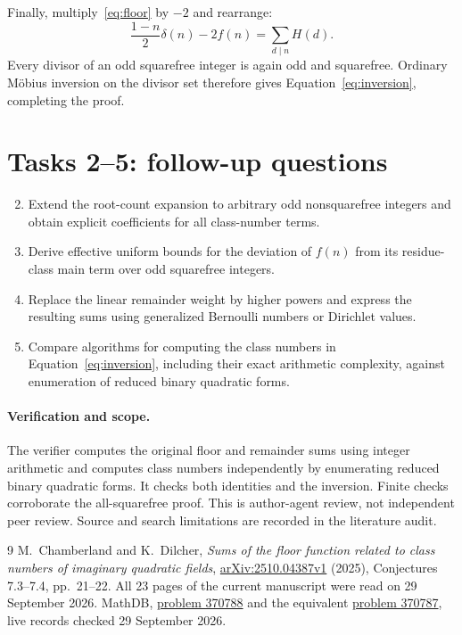 \documentclass[11pt]{article}
\begin{document}
Finally, multiply~\eqref{eq:floor} by $-2$ and rearrange:
\[
 \frac{1-n}{2}\delta(n)-2f(n)=\sum_{d\mid n}H(d).
\]
Every divisor of an odd squarefree integer is again odd and squarefree.
Ordinary M\"obius inversion on the divisor set therefore gives
Equation~\eqref{eq:inversion}, completing the proof.

\section*{Tasks 2--5: follow-up questions}
\begin{enumerate}\setcounter{enumi}{1}
\item Extend the root-count expansion to arbitrary odd nonsquarefree
integers and obtain explicit coefficients for all class-number terms.
\item Derive effective uniform bounds for the deviation of $f(n)$ from
its residue-class main term over odd squarefree integers.
\item Replace the linear remainder weight by higher powers and express
the resulting sums using generalized Bernoulli numbers or Dirichlet values.
\item Compare algorithms for computing the class numbers in
Equation~\eqref{eq:inversion}, including their exact arithmetic complexity,
against enumeration of reduced binary quadratic forms.
\end{enumerate}

\paragraph{Verification and scope.}
The verifier computes the original floor and remainder sums using integer
arithmetic and computes class numbers independently by enumerating reduced
binary quadratic forms. It checks both identities and the inversion.
Finite checks corroborate the all-squarefree proof. This is author-agent
review, not independent peer review. Source and search limitations are
recorded in the literature audit.

\begin{thebibliography}{9}
 M.~Chamberland and K.~Dilcher,
\emph{Sums of the floor function related to class numbers of imaginary
quadratic fields},
\href{https://arxiv.org/abs/2510.04387}{arXiv:2510.04387v1} (2025),
Conjectures 7.3--7.4, pp.~21--22.
All 23 pages of the current manuscript were read on 29 September 2026.
 MathDB,
\href{https://mathdb.com/p/370788}{problem 370788} and the equivalent
\href{https://mathdb.com/p/370787}{problem 370787},
live records checked 29 September 2026.
\end{thebibliography}
\end{document}

